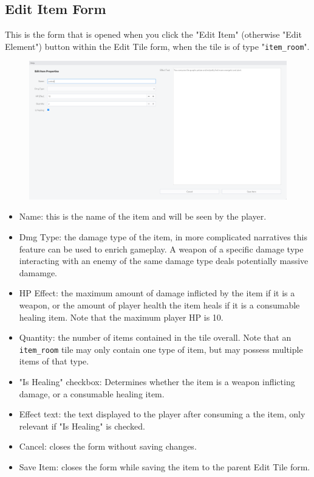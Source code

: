 \documentclass{article} \usepackage[margin=1in,headheight=57pt,headsep=0.1in]{geometry}
\begin{document}
\subsection{Edit Item Form}
This is the form that is opened when you click the "Edit Item" (otherwise "Edit Element") button within the Edit Tile form, when the tile is of type "\texttt{item\_room}".
\begin{figure}[H]
	\centering
	\includegraphics[width=1.0\textwidth]{./editItemForm.png}
\end{figure}
\begin{itemize}
	\item Name: this is the name of the item and will be seen by the player.
	\item Dmg Type: the damage type of the item, in more complicated narratives this feature can be used to enrich gameplay. A weapon of a specific damage type interacting with an enemy of the same damage type deals potentially massive damamge.
	\item HP Effect: the maximum amount of damage inflicted by the item if it is a weapon, or the amount of player health the item heals if it is a consumable healing item. Note that the maximum player HP is 10.
	\item Quantity: the number of items contained in the tile overall. Note that an \texttt{item\_room} tile may only contain one type of item, but may possess multiple items of that type.
	\item "Is Healing" checkbox: Determines whether the item is a weapon inflicting damage, or a consumable healing item.
	\item Effect text: the text displayed to the player after consuming a the item, only relevant if "Is Healing" is checked.
	\item Cancel: closes the form without saving changes.
	\item Save Item: closes the form while saving the item to the parent Edit Tile form.
\end{itemize}
\end{document}
